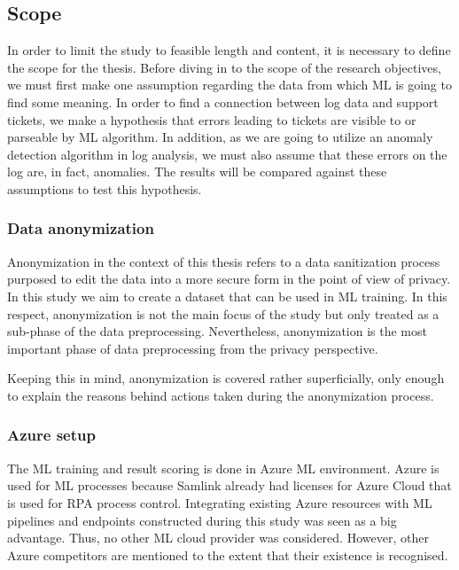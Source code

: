 \subsection{Scope}\label{subsec:intro-scope}

In order to limit the study
to feasible length and content,
it is necessary to define the scope for the thesis.
Before diving in to the scope of the research objectives,
we must first make one assumption regarding the data
from which ML is going to find some meaning.
In order to find a connection between log data and support tickets,
we make a hypothesis that errors leading to tickets
are visible to or parseable by ML algorithm.
In addition,
as we are going to utilize an anomaly detection algorithm in log analysis,
we must also assume that these errors on the log
are, in fact, anomalies.
The results will be compared against these assumptions
to test this hypothesis.


\subsubsection*{Data anonymization}
Anonymization in the context of this thesis
refers to a data sanitization process
purposed to edit the data into
a more secure form in the point of view of privacy.
In this study
we aim to create a dataset that can be used in ML training.
In this respect,
anonymization is not the main focus of the study
but only treated as a sub-phase
of the data preprocessing.
Nevertheless,
anonymization is the most important phase of data preprocessing
from the privacy perspective.

Keeping this in mind,
anonymization is covered rather superficially,
only enough to explain the reasons
behind actions taken during the anonymization process.


\subsubsection*{Azure setup}
The ML training and result scoring
is done in Azure ML environment.
Azure is used for ML processes
because Samlink already had licenses for Azure Cloud
that is used for RPA process control.
Integrating existing Azure resources
with ML pipelines and endpoints constructed during this study
was seen as a big advantage.
Thus,
no other ML cloud provider was considered.
However,
other Azure competitors are mentioned to the extent
that their existence is recognised.

